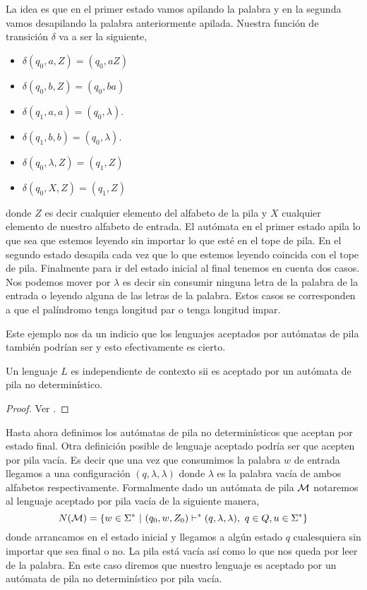 \documentclass[tesis.tex]{subfiles}
\begin{document}
\begin{ej}
	La idea es que en el primer estado vamos apilando la palabra y en la segunda vamos desapilando la palabra anteriormente apilada. 
	Nuestra función de transición $\delta$ va a ser la siguiente,
	\begin{itemize}
		\item $\delta(q_0,a,Z) = (q_0,aZ)$ 
		\item $\delta(q_0,b,Z) = (q_0,ba)$ 
		\item $\delta(q_1,a,a) = (q_0,\lambda)$.
		\item $\delta(q_1,b,b) = (q_0,\lambda)$.
		\item $\delta (q_0, \lambda, Z) = (q_1,Z)$
		\item $\delta (q_0, X, Z) = (q_1, Z)$ 
	\end{itemize}
	donde $Z$ es decir cualquier elemento del alfabeto de la pila y $X$ cualquier elemento de nuestro alfabeto de entrada. 
	El autómata en el primer estado apila lo que sea que estemos leyendo sin importar lo que esté en el tope de pila. 
	En el segundo estado desapila cada vez que lo que estemos leyendo coincida con el tope de pila. 
	Finalmente para ir del estado inicial al final tenemos en cuenta dos casos. 
	Nos podemos mover por $\lambda$ es decir sin consumir ninguna letra de la palabra de la entrada o leyendo alguna de las letras de la palabra. 
	Estos casos se corresponden a que el palíndromo tenga longitud par o tenga longitud impar.	
\end{ej}

Este ejemplo nos da un indicio que los lenguajes aceptados por autómatas de pila también podrían ser \ic y esto efectivamente es cierto.

\medskip

\begin{teo}\label{teo_ic_apnd}
Un lenguaje $L$ es independiente de contexto sii es aceptado por un autómata de pila no determinístico.
\end{teo}

\begin{proof}
	Ver \cite{hopcraft-ullman}.
\end{proof}
 


Hasta ahora definimos los autómatas de pila no determinísticos que aceptan por estado final. Otra definición posible de lenguaje aceptado podría ser que acepten por pila vacía. 
Es decir que una vez que consumimos la palabra $w$ de entrada llegamos a una configuración $(q, \lambda, \lambda)$ donde $\lambda$ es la palabra vacía de ambos alfabetos respectivamente. Formalmente dado un autómata de pila $\cal M$  notaremos al lenguaje aceptado por pila vacía de la siguiente manera,
\begin{equation*}
	N({\cal M}) = \{ w \in \Sigma^* \ | \ (q_0,w,Z_0) \vdash^* (q, \lambda, \lambda), \ q \in Q, u \in \Sigma^*    \}
\end{equation*}
donde arrancamos en el estado inicial y llegamos a algún estado $q$ cualesquiera sin importar que sea final o no.
La pila está vacía así como lo que nos queda por leer de la palabra. 
En este caso diremos que nuestro lenguaje es aceptado por un autómata de pila no determinístico por pila vacía.
\end{document}
